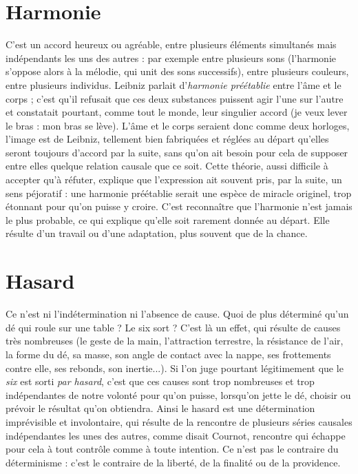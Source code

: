 \section{Harmonie}
C'est un accord heureux ou agréable, entre plusieurs éléments
simultanés mais indépendants les uns des autres : par exemple
entre plusieurs sons (l'harmonie s’oppose alors à la mélodie, qui unit des sons
successifs), entre plusieurs couleurs, entre plusieurs individus. Leibniz parlait
d'{\it harmonie préétablie} entre l'âme et le corps ; c’est qu’il refusait que ces deux
substances puissent agir l’une sur l’autre et constatait pourtant, comme tout le
monde, leur singulier accord (je veux lever le bras : mon bras se lève). L'âme
et le corps seraient donc comme deux horloges, l’image est de Leibniz, tellement
bien fabriquées et réglées au départ qu’elles seront toujours d’accord par
la suite, sans qu’on ait besoin pour cela de supposer entre elles quelque relation
causale que ce soit. Cette théorie, aussi difficile à accepter qu’à réfuter, explique
que l'expression ait souvent pris, par la suite, un sens péjoratif : une harmonie
préétablie serait une espèce de miracle originel, trop étonnant pour qu’on
puisse y croire. C’est reconnaître que l’harmonie n’est jamais le plus probable,
ce qui explique qu’elle soit rarement donnée au départ. Elle résulte d’un travail
ou d’une adaptation, plus souvent que de la chance.

\section{Hasard}
Ce n’est ni l’indétermination ni l'absence de cause. Quoi de plus
déterminé qu’un dé qui roule sur une table ? Le six sort ? C’est là
un effet, qui résulte de causes très nombreuses (le geste de la main, l'attraction
terrestre, la résistance de l'air, la forme du dé, sa masse, son angle de contact
avec la nappe, ses frottements contre elle, ses rebonds, son inertie...). Si l'on
juge pourtant légitimement que le {\it six} est sorti {\it par hasard}, c’est que ces causes
sont trop nombreuses et trop indépendantes de notre volonté pour qu’on
puisse, lorsqu'on jette le dé, choisir ou prévoir le résultat qu’on obtiendra. Ainsi
le hasard est une détermination imprévisible et involontaire, qui résulte de la
rencontre de plusieurs séries causales indépendantes les unes des autres, comme
disait Cournot, rencontre qui échappe pour cela à tout contrôle comme à toute
intention. Ce n’est pas le contraire du déterminisme : c’est le contraire de la
liberté, de la finalité ou de la providence.

